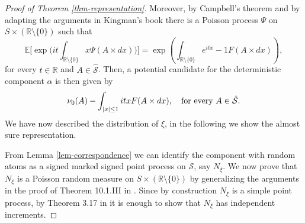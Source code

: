 \documentclass{article}
\theoremstyle{plain}
\theoremstyle{remark}
\begin{document}
\begin{proof}[Proof of Theorem \ref{thm-representation}]
	Moreover, by Campbell's theorem and by adapting the arguments in Kingman's book \cite{King} there is a Poisson process $\Psi$ on $S\times(\mathbb{R}\setminus\{0\})$ such that
	\begin{equation*}
		\mathbb{E}\bigg[\exp\bigg(it\int_{\mathbb{R}\setminus\{0\}}x\Psi(A\times dx)\bigg)\bigg]=	\exp\left(\int_{\mathbb{R}\setminus\{0\}}e^{itx}-1 F(A\times dx)\right),
	\end{equation*}
	for every $t\in\mathbb{R}$ and $A\in\hat{\mathcal{S}}$. Then, a potential candidate for the deterministic component $\alpha$ is then given by 
	\begin{equation*}
		\nu_0(A)-\int_{|x|\leq 1}itx F(A\times dx)  ,\quad\textnormal{for every $A\in\hat{\mathcal{S}}$.}
	\end{equation*}
	We have now described the distribution of $\xi$, in the following we show the almost sure representation. 
	
	From Lemma \ref{lem-correspondence} we can identify the component with random atoms as a signed marked signed point process on $\mathcal{S}$, say $N_\xi$. We now prove that $N_\xi$ is a Poisson random measure on $S\times(\mathbb{R}\setminus\{0\})$ by generalizing the arguments in the proof of Theorem 10.1.III in \cite{Daley}. Since by construction $N_\xi$ is a simple point process, by Theorem 3.17 in \cite{Kallenberg2} it is enough to show that $N_\xi$ has independent increments. 
	

\end{proof}
\end{document}
